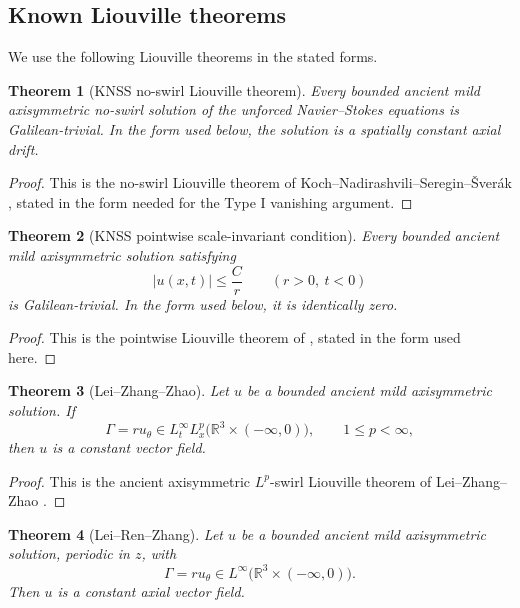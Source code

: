 \documentclass[11pt]{amsart}
\theoremstyle{plain}
\newtheorem{theorem}{Theorem}[section]
\theoremstyle{definition}
\theoremstyle{remark}
\numberwithin{equation}{section}
\begin{document}
\subsection{Known Liouville theorems}

We use the following Liouville theorems in the stated forms.

\begin{theorem}[KNSS no-swirl Liouville theorem]
\label{thm:knss-noswirl}
Every bounded ancient mild axisymmetric no-swirl solution of the unforced
Navier--Stokes equations is Galilean-trivial.  In the form used below, the
solution is a spatially constant axial drift.
\end{theorem}

\begin{proof}
This is the no-swirl Liouville theorem of
Koch--Nadirashvili--Seregin--\v{S}ver\'ak \cite{KNSS2009}, stated in the form
needed for the Type I vanishing argument.
\end{proof}

\begin{theorem}[KNSS pointwise scale-invariant condition]
\label{thm:knss-pointwise}
Every bounded ancient mild axisymmetric solution satisfying
\[
   |u(x,t)|\le \frac{C}{r}
   \qquad(r>0,\ t<0)
\]
is Galilean-trivial.  In the form used below, it is identically zero.
\end{theorem}

\begin{proof}
This is the pointwise Liouville theorem of \cite{KNSS2009}, stated in the form
used here.
\end{proof}

\begin{theorem}[Lei--Zhang--Zhao]
\label{thm:lzz}
Let \(u\) be a bounded ancient mild axisymmetric solution.  If
\[
   \Gamma=ru_\theta\in L_t^\infty L_x^p
   \bigl(\mathbb R^3\times(-\infty,0)\bigr),
   \qquad 1\le p<\infty,
\]
then \(u\) is a constant vector field.
\end{theorem}

\begin{proof}
This is the ancient axisymmetric \(L^p\)-swirl Liouville theorem of
Lei--Zhang--Zhao \cite{LZZ}.
\end{proof}

\begin{theorem}[Lei--Ren--Zhang]
\label{thm:lrz}
Let \(u\) be a bounded ancient mild axisymmetric solution, periodic in \(z\),
with
\[
   \Gamma=ru_\theta\in L^\infty
   \bigl(\mathbb R^3\times(-\infty,0)\bigr).
\]
Then \(u\) is a constant axial vector field.
\end{theorem}
\end{document}
